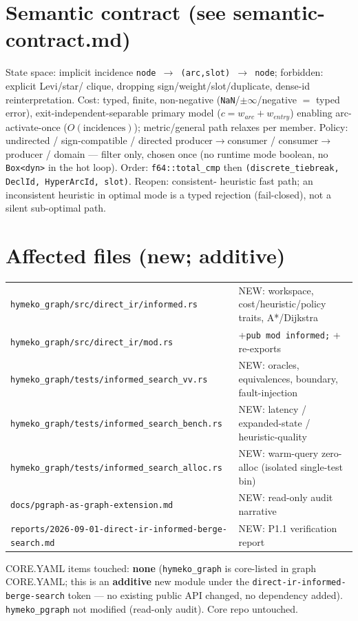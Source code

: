 \documentclass[11pt]{article}
\begin{document}
\section*{Semantic contract (see semantic-contract.md)}
State space: implicit incidence \texttt{node $\to$ (arc,slot) $\to$ node}; forbidden: explicit Levi/star/
clique, dropping sign/weight/slot/duplicate, dense-id reinterpretation. Cost: typed, finite, non-negative
(\texttt{NaN}/$\pm\infty$/negative $=$ typed error), exit-independent-separable primary model
($c=w_{arc}+w_{entry}$) enabling arc-activate-once ($O(\text{incidences})$); metric/general path relaxes per
member. Policy: undirected / sign-compatible / directed producer$\to$consumer / consumer$\to$producer /
domain --- filter only, chosen once (no runtime mode boolean, no \texttt{Box<dyn>} in the hot loop). Order:
\texttt{f64::total\_cmp} then \texttt{(discrete\_tiebreak, DeclId, HyperArcId, slot)}. Reopen: consistent-
heuristic fast path; an inconsistent heuristic in optimal mode is a typed rejection (fail-closed), not a
silent sub-optimal path.

\section*{Affected files (new; additive)}
\begin{longtable}{l l}
\texttt{hymeko\_graph/src/direct\_ir/informed.rs} & NEW: workspace, cost/heuristic/policy traits, A*/Dijkstra \\
\texttt{hymeko\_graph/src/direct\_ir/mod.rs} & +\texttt{pub mod informed;} + re-exports \\
\texttt{hymeko\_graph/tests/informed\_search\_vv.rs} & NEW: oracles, equivalences, boundary, fault-injection \\
\texttt{hymeko\_graph/tests/informed\_search\_bench.rs} & NEW: latency / expanded-state / heuristic-quality \\
\texttt{hymeko\_graph/tests/informed\_search\_alloc.rs} & NEW: warm-query zero-alloc (isolated single-test bin) \\
\texttt{docs/pgraph-as-graph-extension.md} & NEW: read-only audit narrative \\
\texttt{reports/2026-09-01-direct-ir-informed-berge-search.md} & NEW: P1.1 verification report \\
\end{longtable}
CORE.YAML items touched: \textbf{none} (\texttt{hymeko\_graph} is core-listed in graph CORE.YAML; this is an
\textbf{additive} new module under the \texttt{direct-ir-informed-berge-search} token --- no existing public
API changed, no dependency added). \texttt{hymeko\_pgraph} not modified (read-only audit). Core repo
untouched.
\end{document}
